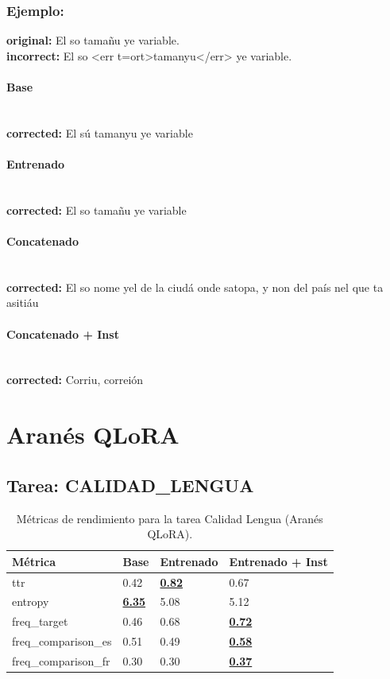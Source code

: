 \subsubsection{Ejemplo:}
\textbf{original:} El so tamañu ye variable.\\
\textbf{incorrect:} El so {\textless}err t=ort{\textgreater}tamanyu{\textless}/err{\textgreater} ye variable.

\paragraph{Base}~\\
\textbf{corrected:} El sú tamanyu ye variable

\paragraph{Entrenado}~\\
\textbf{corrected:} El so tamañu ye variable

\paragraph{Concatenado}~\\
\textbf{corrected:} El so nome ye\textquotesingle{}l de la ciudá onde s\textquotesingle{}atopa, y non del país nel que ta asitiáu

\paragraph{Concatenado + Inst}~\\
\textbf{corrected:} Corriu, correión

\vspace{1em}

\section{Aranés QLoRA}

\subsection{Tarea: CALIDAD\_LENGUA}\label{tarea-calidad_lengua}
\begin{longtable}[]{@{}llll@{}}
\toprule\noalign{}
Métrica & Base & Entrenado & Entrenado + Inst \\
\midrule\noalign{}
\endhead
\bottomrule\noalign{}
\caption{Métricas de rendimiento para la tarea Calidad Lengua (Aranés QLoRA).}
\label{tab:metricas_calidad_lengua_Aranés QLoRA}
\endlastfoot
ttr & 0.42 & \textbf{\underline{0.82}} & 0.67 \\
entropy & \textbf{\underline{6.35}} & 5.08 & 5.12 \\
freq\_target & 0.46 & 0.68 & \textbf{\underline{0.72}} \\
freq\_comparison\_es & 0.51 & 0.49 & \textbf{\underline{0.58}} \\
freq\_comparison\_fr & 0.30 & 0.30 & \textbf{\underline{0.37}} \\
\end{longtable}

